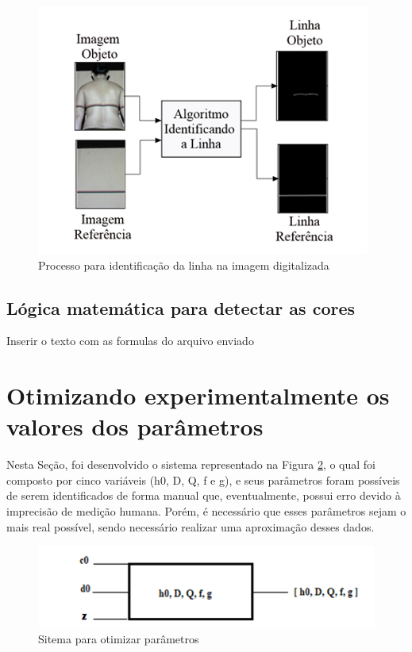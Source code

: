 \documentclass[a4paper, 12pt]{article}
\begin{document}
\begin{figure}[H]
	\centering
		\includegraphics[scale=0.5]{identificar_linha_imagem.png}
	\caption{Processo para identificação da linha na imagem digitalizada}
	\label{identificar linha na imagem}
\end{figure}

\subsection{Lógica matemática para detectar as cores}

Inserir o texto com as formulas do arquivo enviado


\section{Otimizando experimentalmente os valores dos parâmetros}
Nesta Seção, foi desenvolvido o sistema representado na Figura \ref{sitema_otimizacao}, o qual foi composto por cinco variáveis (h0, D, Q, f e g), e seus parâmetros foram possíveis de serem identificados de forma manual que, eventualmente, possui erro devido à imprecisão de medição humana. Porém, é necessário que esses parâmetros sejam o mais real possível, sendo necessário realizar uma aproximação desses dados.

\begin{figure}[H]
	\centering
		\includegraphics[scale=0.5]{sitema_otimizacao.png}
	\caption{Sitema para otimizar parâmetros}
	\label{sitema_otimizacao}
\end{figure}
\end{document}

